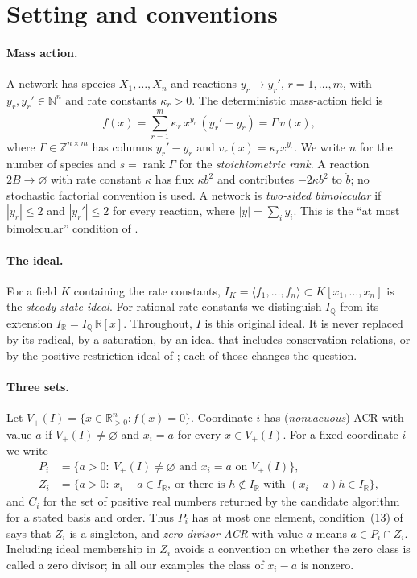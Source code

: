 \documentclass[11pt,a4paper]{article}
\theoremstyle{plain}
\theoremstyle{definition}
\theoremstyle{remark}
\newcommand{\R}{\mathbb{R}}
\newcommand{\Q}{\mathbb{Q}}
\newcommand{\N}{\mathbb{N}}
\newcommand{\rank}{\operatorname{rank}}
\begin{document}
\section{Setting and conventions}\label{sec:setting}

\paragraph{Mass action.}
A network has species $X_1,\dots,X_n$ and reactions $y_r\to y_r'$, $r=1,\dots,m$, with $y_r,y_r'\in\N^n$ and rate constants $\kappa_r>0$. The deterministic mass-action field is
\begin{equation}\label{eq:massaction}
  f(x)=\sum_{r=1}^m\kappa_r\,x^{y_r}\,(y_r'-y_r)=\Gamma\,v(x),
\end{equation}
where $\Gamma\in\mathbb{Z}^{n\times m}$ has columns $y_r'-y_r$ and $v_r(x)=\kappa_rx^{y_r}$. We write $n$ for the number of species and $s=\rank\Gamma$ for the \emph{stoichiometric rank}. A reaction $2B\to\varnothing$ with rate constant $\kappa$ has flux $\kappa b^2$ and contributes $-2\kappa b^2$ to $\dot b$; no stochastic factorial convention is used. A network is \emph{two-sided bimolecular} if $|y_r|\le2$ and $|y_r'|\le2$ for every reaction, where $|y|=\sum_iy_i$. This is the ``at most bimolecular'' condition of \cite{acr}.

\paragraph{The ideal.}
For a field $K$ containing the rate constants, $I_K=\langle f_1,\dots,f_n\rangle\subset K[x_1,\dots,x_n]$ is the \emph{steady-state ideal}. For rational rate constants we distinguish $I_\Q$ from its extension $I_\R=I_\Q\,\R[x]$. Throughout, $I$ is this original ideal. It is never replaced by its radical, by a saturation, by an ideal that includes conservation relations, or by the positive-restriction ideal of \cite{acr}; each of those changes the question.

\paragraph{Three sets.}
Let $V_+(I)=\{x\in\R^n_{>0}:f(x)=0\}$. Coordinate $i$ has (\emph{nonvacuous}) ACR with value $a$ if $V_+(I)\ne\varnothing$ and $x_i=a$ for every $x\in V_+(I)$. For a fixed coordinate $i$ we write
\begin{align*}
  P_i&=\{a>0:\ V_+(I)\neq\varnothing\text{ and }x_i=a\text{ on }V_+(I)\},\\
  Z_i&=\{a>0:\ x_i-a\in I_\R,\ \text{or there is }h\notin I_\R\text{ with }(x_i-a)h\in I_\R\},
\end{align*}
and $C_i$ for the set of positive real numbers returned by the candidate algorithm for a stated basis and order. Thus $P_i$ has at most one element, condition~(13) of \cite{acr} says that $Z_i$ is a singleton, and \emph{zero-divisor ACR} with value $a$ \cite[Definition 4.2]{acr} means $a\in P_i\cap Z_i$. Including ideal membership in $Z_i$ avoids a convention on whether the zero class is called a zero divisor; in all our examples the class of $x_i-a$ is nonzero.
\end{document}
